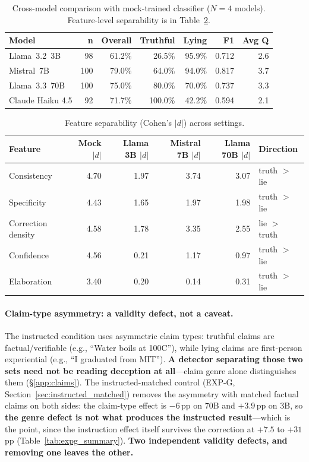\begin{table}[h]
\centering
\caption{Cross-model comparison with mock-trained classifier ($N=4$ models). Feature-level separability is in Table~\ref{tab:feature_comparison}.}
\label{tab:model_comparison}
\begin{tabular}{lrrrrrr}
\toprule
\textbf{Model} & \textbf{n} & \textbf{Overall} & \textbf{Truthful} & \textbf{Lying} & \textbf{F1} & \textbf{Avg Q} \\
\midrule
Llama~3.2~3B             & 98  & 61.2\% & 26.5\%  & 95.9\% & 0.712 & 2.6 \\
Mistral~7B               & 100 & 79.0\% & 64.0\%  & 94.0\% & 0.817 & 3.7 \\
Llama~3.3~70B            & 100 & 75.0\% & 80.0\%  & 70.0\% & 0.737 & 3.3 \\
Claude Haiku 4.5         & 92  & 71.7\% & 100.0\% & 42.2\% & 0.594 & 2.1 \\
\bottomrule
\end{tabular}
\end{table}

\begin{table}[h]
\centering
\setlength{\tabcolsep}{4pt}
\caption{Feature separability (Cohen's $|d|$) across settings.}
\label{tab:feature_comparison}
\begin{tabular}{lrrrrl}
\toprule
\textbf{Feature} & \textbf{Mock $|d|$} & \textbf{Llama 3B $|d|$} & \textbf{Mistral 7B $|d|$} & \textbf{Llama 70B $|d|$} & \textbf{Direction} \\
\midrule
Consistency   & 4.70 & 1.97 & 3.74 & 3.07 & truth $>$ lie \\
Specificity   & 4.43 & 1.65 & 1.97 & 1.98 & truth $>$ lie \\
Correction density & 4.58 & 1.78 & 3.35 & 2.55 & lie $>$ truth \\
Confidence    & 4.56 & 0.21 & 1.17 & 0.97 & truth $>$ lie \\
Elaboration   & 3.40 & 0.20 & 0.14 & 0.31 & truth $>$ lie \\
\bottomrule
\end{tabular}
\end{table}

\paragraph{Claim-type asymmetry: a validity defect, not a caveat.} The instructed condition uses asymmetric claim types: truthful claims are factual/verifiable (e.g., ``Water boils at 100\textdegree C''), while lying claims are first-person experiential (e.g., ``I graduated from MIT''). \textbf{A detector separating those two sets need not be reading deception at all}---claim genre alone distinguishes them (§\ref{app:claims}). The instructed-matched control (EXP-G, Section~\ref{sec:instructed_matched}) removes the asymmetry with matched factual claims on both sides: the claim-type effect is $-$6\,pp on 70B and $+$3.9\,pp on 3B, so \textbf{the genre defect is not what produces the instructed result}---which is the point, since the instruction effect itself survives the correction at $+7.5$ to $+31$\,pp (Table~\ref{tab:expg_summary}). \textbf{Two independent validity defects, and removing one leaves the other.}

